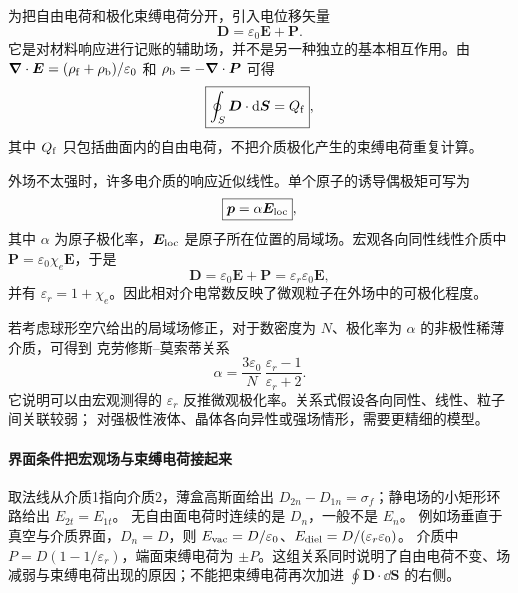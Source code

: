 {为把自由电荷和极化束缚电荷分开，引入电位移矢量
\begin{equation}
  \boxed{\boldsymbol D=\varepsilon_0\boldsymbol E+\boldsymbol P}.
\end{equation}
它是对材料响应进行记账的辅助场，并不是另一种独立的基本相互作用。由
$\boldsymbol\nabla\cdot\boldsymbol E=(\rho_{\rm f}+\rho_{\rm b})/\varepsilon_0$ 和
$\rho_{\rm b}=-\boldsymbol\nabla\cdot\boldsymbol P$ 可得
\begin{equation}
  \boxed{\oint_S\boldsymbol D\cdot\mathrm d\boldsymbol S=Q_{\rm f}},
\end{equation}
其中 $Q_{\rm f}$ 只包括曲面内的自由电荷，不把介质极化产生的束缚电荷重复计算。

外场不太强时，许多电介质的响应近似线性。单个原子的诱导偶极矩可写为
\begin{equation}
  \boxed{\boldsymbol p=\alpha\boldsymbol E_{\rm loc}},
\end{equation}
其中 $\alpha$ 为原子极化率，$\boldsymbol E_{\rm loc}$ 是原子所在位置的局域场。宏观各向同性线性介质中
$\boldsymbol P=\varepsilon_0\chi_e\boldsymbol E$，于是
\begin{equation}
  \boxed{\boldsymbol D=\varepsilon_0\boldsymbol E+\boldsymbol P
  =\varepsilon_r\varepsilon_0\boldsymbol E},
\end{equation}
并有 $\varepsilon_r=1+\chi_e$。因此相对介电常数反映了微观粒子在外场中的可极化程度。

若考虑球形空穴给出的局域场修正，对于数密度为 $N$、极化率为 $\alpha$ 的非极性稀薄介质，可得到
克劳修斯--莫索蒂关系
\begin{equation}
  \boxed{\alpha=\frac{3\varepsilon_0}{N}\,
  \frac{\varepsilon_r-1}{\varepsilon_r+2}}.
\end{equation}
它说明可以由宏观测得的 $\varepsilon_r$ 反推微观极化率。关系式假设各向同性、线性、粒子间关联较弱；
对强极性液体、晶体各向异性或强场情形，需要更精细的模型。

\paragraph{界面条件把宏观场与束缚电荷接起来}
取法线从介质1指向介质2，薄盒高斯面给出
$D_{2n}-D_{1n}=\sigma_f$；静电场的小矩形环路给出 $E_{2t}=E_{1t}$。
无自由面电荷时连续的是 $D_n$，一般不是 $E_n$。
例如场垂直于真空与介质界面，$D_n=D$，则 $E_{\rm vac}=D/\varepsilon_0$、$E_{\rm diel}=D/(\varepsilon_r\varepsilon_0)$。
介质中 $P=D(1-1/\varepsilon_r)$，端面束缚电荷为 $\pm P$。这组关系同时说明了自由电荷不变、场减弱与束缚电荷出现的原因；不能把束缚电荷再次加进 $\oint\boldsymbol D\cdot\dd\boldsymbol S$ 的右侧。




}

